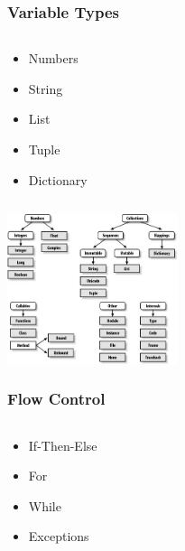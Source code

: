 \documentclass{beamer}
\begin{document}
\begin{frame}
\frametitle{Variable Types}
\begin{columns}[c]
	\begin{column}{30cm}
		\vspace{.1cm}
		\begin{itemize}
			\justifying
			\item Numbers
			\item String
			\item List
			\item Tuple
			\item Dictionary
		\end{itemize}
	\end{column}
\end{columns}
	\vspace{.5cm}
	\hspace*{5.5cm} \includegraphics[width=5cm]{figs/python-types.jpg}
\end{frame}

\begin{frame}
	\frametitle{Flow Control}
	\begin{columns}[c]
		\begin{column}{30cm}
			\vspace{.1cm}
			\begin{itemize}
				\justifying
				\item If-Then-Else
				\item For
				\item While
				\item Exceptions
			\end{itemize}
		\end{column}
	\end{columns}
	\vspace{.5cm}
	\hspace*{5.5cm}
\end{frame}
\end{document}
